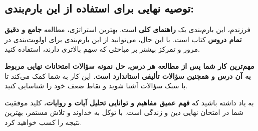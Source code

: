 \documentclass[11pt,a4paper]{article}
\begin{document}
\subsection*{توصیه نهایی برای استفاده از این بارم‌بندی:}

فرزندم، این بارم‌بندی یک \textbf{راهنمای کلی} است. بهترین استراتژی، مطالعه \textbf{جامع و دقیق تمام دروس} کتاب است. با این حال، می‌توانید از این بارم‌بندی برای اولویت‌بندی در مرور و تمرکز بیشتر بر مباحثی که سهم بالاتری دارند، استفاده کنید.

\textbf{مهم‌ترین کار شما پس از مطالعه هر درس، حل نمونه سؤالات امتحانات نهایی مربوط به آن درس و همچنین سؤالات تألیفی استاندارد است.} این کار به شما کمک می‌کند تا با سبک سؤالات آشنا شوید و نقاط ضعف خود را شناسایی کنید.

به یاد داشته باشید که \textbf{فهم عمیق مفاهیم و توانایی تحلیل آیات و روایات}، کلید موفقیت شما در امتحان نهایی دین و زندگی است. با توکل به خداوند و تلاش مستمر، بهترین نتیجه را کسب خواهید کرد.
\end{document}
